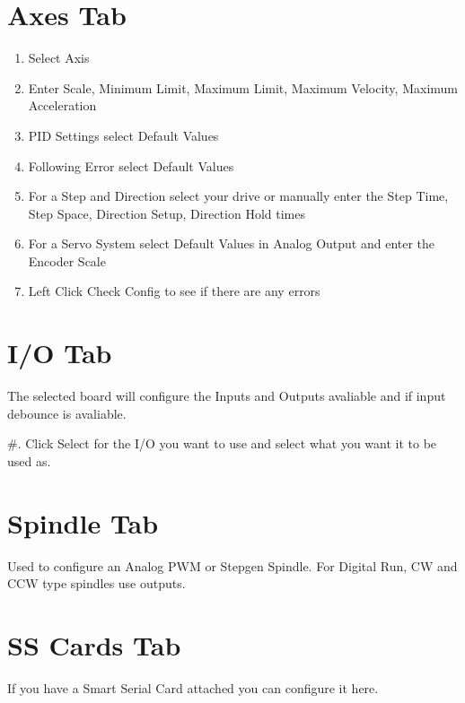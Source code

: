 \documentclass[letterpaper,10pt,english,openany,oneside]{sphinxmanual}
\begin{document}
\section{Axes Tab}
\label{\detokenize{basic:axes-tab}}\begin{enumerate}
%
\item {} 
Select Axis

\item {} 
Enter Scale, Minimum Limit, Maximum Limit, Maximum Velocity, Maximum
Acceleration

\item {} 
PID Settings select Default Values

\item {} 
Following Error select Default Values

\item {} 
For a Step and Direction select your drive or manually enter the Step
Time, Step Space, Direction Setup, Direction Hold times

\item {} 
For a Servo System select Default Values in Analog Output and enter
the Encoder Scale

\item {} 
Left Click Check Config to see if there are any errors

\end{enumerate}


\section{I/O Tab}
\label{\detokenize{basic:i-o-tab}}
The selected board will configure the Inputs and Outputs avaliable and
if input debounce is avaliable.

\#. Click Select for the I/O you want to use and select what you want it
to be used as.


\section{Spindle Tab}
\label{\detokenize{basic:spindle-tab}}
Used to configure an Analog PWM or Stepgen Spindle. For Digital Run, CW
and CCW type spindles use outputs.


\section{SS Cards Tab}
\label{\detokenize{basic:ss-cards-tab}}
If you have a Smart Serial Card attached you can configure it here.
\end{document}
